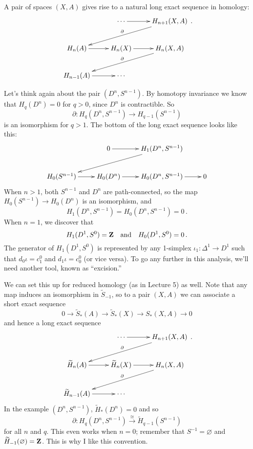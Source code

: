 \begin{example} A pair of spaces $(X,A)$ gives rise to a natural long exact 
sequence in homology:
\begin{equation*}
\xymatrix{ 
& \cdots \ar[r] & H_{n+1}(X,A) \ar[dll]_\partial\\
 H_n(A)\ar[r] & H_n(X)\ar[r] & H_n(X,A)\ar[dll]_\partial\\
 H_{n-1}(A)\ar[r] & \cdots & 
}\,.
\end{equation*}
\end{example}

\begin{example} Let's think again about the pair $(D^n,S^{n-1})$. By homotopy invariance we know that $H_q(D^n)=0$ for $q>0$, since $D^n$ is contractible. So 
\[
\partial:H_q(D^n,S^{n-1})\to H_{q-1}(S^{n-1})
\] 
is an isomorphism for $q>1$. The bottom of the long exact sequence looks like 
this: 
\[
\xymatrix{
& 0 \ar[r] & H_1(D^n,S^{n-1}) \ar[lld] \\
H_0(S^{n-1}) \ar[r] & H_0(D^n) \ar[r] & H_0(D^n,S^{n-1}) \ar[r] & 0
}\]
When $n>1$, both $S^{n-1}$ and $D^n$ are path-connected, so the map
$H_0(S^{n-1})\to H_0(D^n)$ is an isomorphism, and 
\[
H_1(D^n,S^{n-1})=H_0(D^n,S^{n-1})=0\,.
\]
When $n=1$, we discover that
\[
H_1(D^1,S^0)=\mathbf{Z} \quad\hbox{and}\quad H_0(D^1,S^0)=0\,.
\]
The generator of $H_1(D^1,S^0)$ is represented by any 1-simplex 
$\iota_1:\Delta^1\to D^1$ such that $d_0\iota=c^0_1$ and $d_1\iota=c^0_0$ 
(or vice versa). 
To go any further in this analysis, we'll need another tool, known as
``excision.'' 
\end{example}

We can set this up for reduced homology (as in Lecture 5) as well. 
Note that any map induces an isomorphism in $\widetilde S_{-1}$, so to
a pair $(X,A)$ we can associate a short exact sequence
\[
0\to\widetilde S_*(A)\to\widetilde S_*(X)\to S_*(X,A)\to0
\]
and hence a long exact sequence 
\begin{equation*}
\xymatrix{ 
& \cdots \ar[r] & H_{n+1}(X,A)\ar[dll]_\partial\\
\widetilde H_n(A)\ar[r] & \widetilde H_n(X)\ar[r] & H_n(X,A)\ar[dll]_\partial\\\widetilde H_{n-1}(A)\ar[r] & \cdots &
}\,.
\end{equation*}
In the example $(D^n,S^{n-1})$, $\widetilde H_*(D^n)=0$ and so 
\[
\partial:H_q(D^n,S^{n-1})\xrightarrow{\cong}\widetilde H_{q-1}(S^{n-1})
\]
for all $n$ and $q$.
This even works when $n=0$; remember that $S^{-1}=\varnothing$ and 
$\widetilde H_{-1}(\varnothing)=\mathbf Z$. This is why I like this convention.

